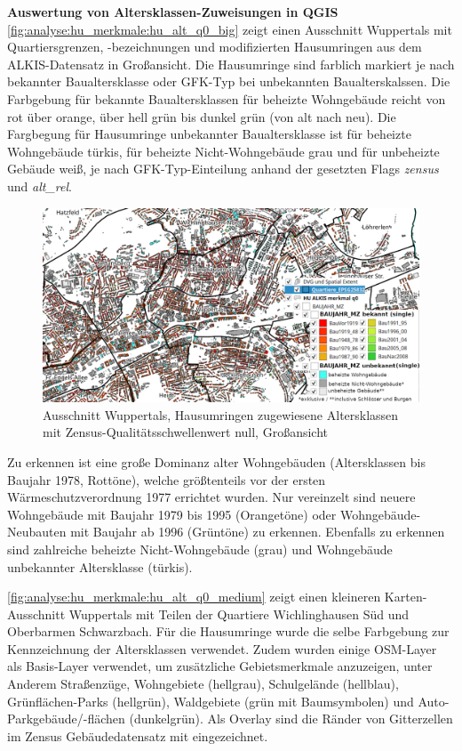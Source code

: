 		\textbf{Auswertung von Altersklassen-Zuweisungen in QGIS}\\
		\autoref{fig:analyse:hu_merkmale:hu_alt_q0_big} zeigt einen Ausschnitt Wuppertals mit Quartiersgrenzen, -bezeichnungen und modifizierten Hausumringen aus dem ALKIS-Datensatz in Großansicht. Die Hausumringe sind farblich markiert je nach bekannter Baualtersklasse oder GFK-Typ bei unbekannten Baualterskalssen. Die Farbgebung für bekannte Baualtersklassen für beheizte Wohngebäude reicht von rot über orange, über hell grün bis dunkel grün (von alt nach neu). Die Fargbegung für Hausumringe unbekannter Baualtersklasse ist für beheizte Wohngebäude türkis, für beheizte Nicht-Wohngebäude  grau und für unbeheizte Gebäude weiß, je nach GFK-Typ-Einteilung anhand der gesetzten Flags \textit{zensus} und \textit{alt\_rel}.
		
		\begin{figure}[h]
			\centering
			\includegraphics[width=\linewidth]{./Medien/own/hu_merk/qgis_hu_alt_q0_wuppertal_ausschnitt_big.png}
			\caption{Ausschnitt Wuppertals, Hausumringen zugewiesene Altersklassen mit Zensus-Qualitätsschwellenwert null, Großansicht}
			\label{fig:analyse:hu_merkmale:hu_alt_q0_big}
		\end{figure}
		
		Zu erkennen ist eine große Dominanz alter Wohngebäuden (Altersklassen bis Baujahr 1978, Rottöne), welche größtenteils vor der ersten Wärmeschutzverordnung 1977 errichtet wurden. Nur vereinzelt sind neuere Wohngebäude mit Baujahr 1979 bis 1995 (Orangetöne) oder Wohngebäude-Neubauten mit Baujahr ab 1996 (Grüntöne) zu erkennen. Ebenfalls zu erkennen sind zahlreiche beheizte Nicht-Wohngebäude (grau) und Wohngebäude unbekannter Altersklasse (türkis). 

		\autoref{fig:analyse:hu_merkmale:hu_alt_q0_medium} zeigt einen kleineren Karten-Ausschnitt Wuppertals mit Teilen der Quartiere Wichlinghausen Süd und Oberbarmen Schwarzbach. Für die Hausumringe wurde die selbe Farbgebung zur Kennzeichnung der Altersklassen verwendet. Zudem wurden einige OSM-Layer als Basis-Layer verwendet, um zusätzliche Gebietsmerkmale anzuzeigen, unter Anderem Straßenzüge, Wohngebiete (hellgrau), Schulgelände (hellblau), Grünflächen-Parks (hellgrün), Waldgebiete (grün mit Baumsymbolen) und Auto-Parkgebäude/-flächen (dunkelgrün). Als Overlay sind die Ränder von Gitterzellen im Zensus Gebäudedatensatz mit eingezeichnet. 
					
